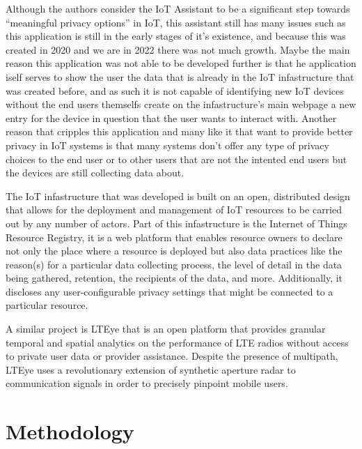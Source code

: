 \documentclass[conference]{IEEEtran}
\begin{document}
Although the authors consider the IoT Assistant to be a significant step towards
``meaningful privacy options'' in IoT, this assistant still has many issues such as
this application is still in the early stages of it's existence, and because this was
created in 2020 and we are in 2022 there was not much growth. Maybe the main reason
this application was not able to be developed further is that he application iself
serves to show the user the data that is already in the IoT infastructure that was created before,
and as such it is not capable of identifying new IoT devices without the end users themselfs
create on the infastructure's main webpage \cite{DasPersonalized} a new entry for the device in question that the
user wants to interact with. Another reason that cripples this application and many like
it that want to provide better privacy in IoT systems is that many systems don't
offer any type of privacy choices to the end user or to other users that are not
the intented end users but the devices are still collecting data about.

The IoT infastructure that was developed \cite{DasPersonalized} is built on an open, distributed design
that allows for the deployment and management of IoT resources to be carried out
by any number of actors. Part of this infastructure is the Internet of Things Resource Registry,
it is a web platform that enables resource owners to declare not only the place where a
resource is deployed but also data practices like the reason(s) for a particular data collecting
process, the level of detail in the data being gathered, retention, the recipients of the data,
and more. Additionally, it discloses any user-configurable privacy settings that might be
connected to a particular resource.

A similar project is LTEye \cite{KumarLTE} that is an open
platform that provides granular temporal and spatial analytics on the performance of LTE
radios without access to private user data or provider assistance. Despite the presence of
multipath, LTEye uses a revolutionary extension of synthetic aperture radar to communication
signals in order to precisely pinpoint mobile users.

\section{Methodology}
\end{document}
